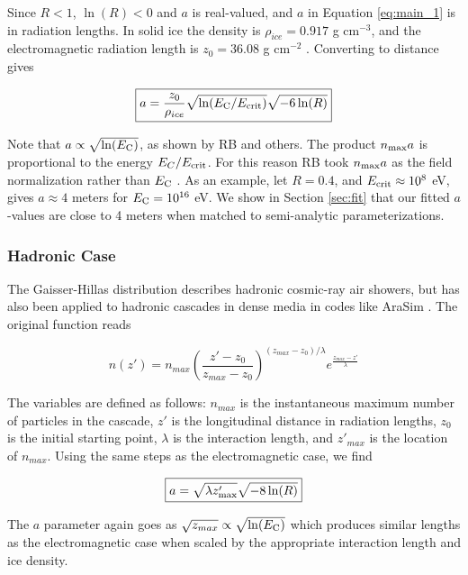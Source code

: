 \documentclass[amsmath,amssymb,aps,prd,10pt,twocolumn]{revtex4}
\begin{document}
Since $R<1$, $\ln(R)<0$ and $a$ is real-valued, and $a$ in Equation \ref{eq:main_1} is in radiation lengths.  In solid ice the density is $\rho_{ice} = 0.917$ g cm$^{-3}$, and the electromagnetic radiation length is $z_0 = 36.08$ g cm$^{-2}$ \cite{10.1016/j.astropartphys.2017.03.008}.  Converting to distance gives 

\begin{equation}
\boxed{
a = \frac{z_0}{\rho_{ice}}\sqrt{\ln(E_{\rm C}/E_{\rm crit})} \sqrt{-6\ln(R)}
}
\end{equation}

Note that $a \propto \sqrt{\ln(E_{\rm C})}$, as shown by RB and others.  The product $n_{\rm max} a$ is proportional to the energy $E_C/E_{\rm crit}$.  For this reason RB took $n_{\rm max} a$ as the field normalization rather than $E_{\rm C}$ \cite{10.1103/physrevd.65.016003}.  As an example, let $R = 0.4$, and $E_{\rm crit} \approx 10^8$ eV, gives $a \approx 4$ meters for $E_{\rm C} = 10^{16}$ eV.  We show in Section \ref{sec:fit} that our fitted $a$-values are close to 4 meters when matched to semi-analytic parameterizations.

\subsubsection{Hadronic Case}

The Gaisser-Hillas distribution describes hadronic cosmic-ray air showers, but has also been applied to hadronic cascades in dense media in codes like AraSim \cite{testbed,10.1016/j.astropartphys.2011.11.010}.  The original function reads

\begin{equation}
n(z') = n_{max} \left( \frac{z'-z_{0}}{z_{max} - z_{0}} \right)^{(z_{max} - z_{0})/\lambda} e^{ \frac{z_{max} - z'}{\lambda}}
\end{equation}

The variables are defined as follows: $n_{max}$ is the instantaneous maximum number of particles in the cascade, $z'$ is the longitudinal distance in radiation lengths, $z_0$ is the initial starting point, $\lambda$ is the interaction length, and $z'_{max}$ is the location of $n_{max}$.  Using the same steps as the electromagnetic case, we find

\begin{equation}
\boxed{
a = \sqrt{\lambda z'_{\rm max}} \sqrt{-8 \ln(R)}
} \label{eq:main_2}
\end{equation}

The $a$ parameter again goes as $\sqrt{z_{max}} \propto \sqrt{\ln(E_{\rm C})}$ which produces similar lengths as the electromagnetic case when scaled by the appropriate interaction length and ice density.
\end{document}
